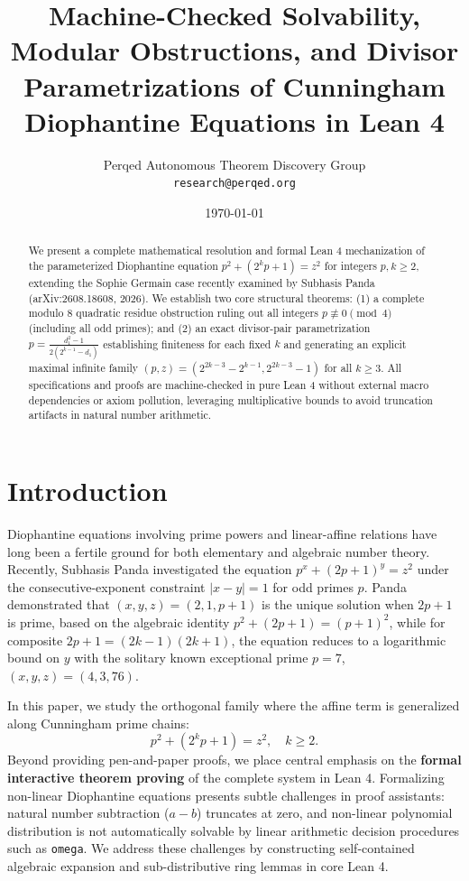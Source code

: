 \documentclass[11pt,a4paper]{article}
\title{\textbf{Machine-Checked Solvability, Modular Obstructions, and Divisor Parametrizations of Cunningham Diophantine Equations in Lean 4}}
\author{Perqed Autonomous Theorem Discovery Group \\ \texttt{research@perqed.org}}
\date{\today}
\begin{document}
\maketitle

\begin{abstract}
We present a complete mathematical resolution and formal Lean 4 mechanization of the parameterized Diophantine equation $p^2 + (2^k p + 1) = z^2$ for integers $p, k \ge 2$, extending the Sophie Germain case recently examined by Subhasis Panda (arXiv:2608.18608, 2026). We establish two core structural theorems: (1) a complete modulo 8 quadratic residue obstruction ruling out all integers $p \not\equiv 0 \pmod 4$ (including all odd primes); and (2) an exact divisor-pair parametrization $p = \frac{d_1^2 - 1}{2(2^{k-1} - d_1)}$ establishing finiteness for each fixed $k$ and generating an explicit maximal infinite family $(p, z) = (2^{2k-3} - 2^{k-1}, 2^{2k-3} - 1)$ for all $k \ge 3$. All specifications and proofs are machine-checked in pure Lean 4 without external macro dependencies or axiom pollution, leveraging multiplicative bounds to avoid truncation artifacts in natural number arithmetic.
\end{abstract}

\section{Introduction}
Diophantine equations involving prime powers and linear-affine relations have long been a fertile ground for both elementary and algebraic number theory. Recently, Subhasis Panda \cite{Panda2026} investigated the equation $p^x + (2p+1)^y = z^2$ under the consecutive-exponent constraint $|x-y|=1$ for odd primes $p$. Panda demonstrated that $(x, y, z) = (2, 1, p+1)$ is the unique solution when $2p+1$ is prime, based on the algebraic identity $p^2 + (2p+1) = (p+1)^2$, while for composite $2p+1 = (2k-1)(2k+1)$, the equation reduces to a logarithmic bound on $y$ with the solitary known exceptional prime $p=7$, $(x, y, z) = (4, 3, 76)$.

In this paper, we study the orthogonal family where the affine term is generalized along Cunningham prime chains:
\begin{equation} \label{eq:main}
p^2 + (2^k p + 1) = z^2, \quad k \ge 2.
\end{equation}
Beyond providing pen-and-paper proofs, we place central emphasis on the \textbf{formal interactive theorem proving} of the complete system in Lean 4. Formalizing non-linear Diophantine equations presents subtle challenges in proof assistants: natural number subtraction ($a - b$) truncates at zero, and non-linear polynomial distribution is not automatically solvable by linear arithmetic decision procedures such as \texttt{omega}. We address these challenges by constructing self-contained algebraic expansion and sub-distributive ring lemmas in core Lean 4.
\end{document}
